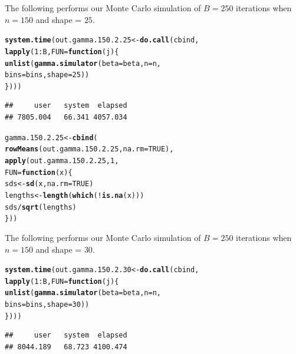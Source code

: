 \documentclass[11pt]{article}\usepackage[]{graphicx}\usepackage[]{color}
\makeatletter
\newcommand{\hlnum}[1]{\textcolor[rgb]{0.686,0.059,0.569}{#1}}%
\newcommand{\hlopt}[1]{\textcolor[rgb]{0,0,0}{#1}}%
\newcommand{\hlstd}[1]{\textcolor[rgb]{0.345,0.345,0.345}{#1}}%
\newcommand{\hlkwa}[1]{\textcolor[rgb]{0.161,0.373,0.58}{\textbf{#1}}}%
\newcommand{\hlkwb}[1]{\textcolor[rgb]{0.69,0.353,0.396}{#1}}%
\newcommand{\hlkwc}[1]{\textcolor[rgb]{0.333,0.667,0.333}{#1}}%
\newcommand{\hlkwd}[1]{\textcolor[rgb]{0.737,0.353,0.396}{\textbf{#1}}}%
\newenvironment{kframe}{%
 \def\at@end@of@kframe{}%
 \ifinner\ifhmode%
  \def\at@end@of@kframe{\end{minipage}}%
  \begin{minipage}{\columnwidth}%
 \fi\fi%
 \def\FrameCommand##1{\hskip\@totalleftmargin \hskip-\fboxsep
 \colorbox{shadecolor}{##1}\hskip-\fboxsep
     \hskip-\linewidth \hskip-\@totalleftmargin \hskip\columnwidth}%
 \MakeFramed {\advance\hsize-\width
   \@totalleftmargin\z@ \linewidth\hsize
   \@setminipage}}%
 {\par\unskip\endMakeFramed%
 \at@end@of@kframe}
\newenvironment{knitrout}{}{} %
\makeatother
\begin{document}
The following performs our Monte Carlo simulation of $B = 250$ iterations 
when $n = 150$ and shape = $25$.

\begin{knitrout}
\color{fgcolor}\begin{kframe}
\begin{alltt}
\hlkwd{system.time}\hlstd{(out.gamma.150.2.25} \hlkwb{<-} \hlkwd{do.call}\hlstd{(cbind,}
  \hlkwd{lapply}\hlstd{(}\hlnum{1}\hlopt{:}\hlstd{B,} \hlkwc{FUN} \hlstd{=} \hlkwa{function}\hlstd{(}\hlkwc{j}\hlstd{)\{}
    \hlkwd{unlist}\hlstd{(}\hlkwd{gamma.simulator}\hlstd{(}\hlkwc{beta} \hlstd{= beta,} \hlkwc{n} \hlstd{= n,}
      \hlkwc{bins} \hlstd{= bins,} \hlkwc{shape} \hlstd{=} \hlnum{25}\hlstd{))}
\hlstd{\})))}
\end{alltt}
\begin{verbatim}
##     user   system  elapsed 
## 7805.004   66.341 4057.034
\end{verbatim}
\end{kframe}
\end{knitrout}

\begin{knitrout}
\color{fgcolor}\begin{kframe}
\begin{alltt}
\hlstd{gamma.150.2.25} \hlkwb{<-} \hlkwd{cbind}\hlstd{(}
  \hlkwd{rowMeans}\hlstd{(out.gamma.150.2.25,} \hlkwc{na.rm} \hlstd{=} \hlnum{TRUE}\hlstd{),}
  \hlkwd{apply}\hlstd{(out.gamma.150.2.25,} \hlnum{1}\hlstd{,}
  \hlkwc{FUN} \hlstd{=} \hlkwa{function}\hlstd{(}\hlkwc{x}\hlstd{)\{}
    \hlstd{sds} \hlkwb{<-} \hlkwd{sd}\hlstd{(x,} \hlkwc{na.rm} \hlstd{=} \hlnum{TRUE}\hlstd{)}
    \hlstd{lengths} \hlkwb{<-} \hlkwd{length}\hlstd{(}\hlkwd{which}\hlstd{(}\hlopt{!}\hlkwd{is.na}\hlstd{(x)))}
    \hlstd{sds} \hlopt{/} \hlkwd{sqrt}\hlstd{(lengths)}
  \hlstd{\}))}
\end{alltt}
\end{kframe}
\end{knitrout}

The following performs our Monte Carlo simulation of $B = 250$ iterations 
when $n = 150$ and shape = $30$.

\begin{knitrout}
\color{fgcolor}\begin{kframe}
\begin{alltt}
\hlkwd{system.time}\hlstd{(out.gamma.150.2.30} \hlkwb{<-} \hlkwd{do.call}\hlstd{(cbind,}
  \hlkwd{lapply}\hlstd{(}\hlnum{1}\hlopt{:}\hlstd{B,} \hlkwc{FUN} \hlstd{=} \hlkwa{function}\hlstd{(}\hlkwc{j}\hlstd{)\{}
    \hlkwd{unlist}\hlstd{(}\hlkwd{gamma.simulator}\hlstd{(}\hlkwc{beta} \hlstd{= beta,} \hlkwc{n} \hlstd{= n,}
      \hlkwc{bins} \hlstd{= bins,} \hlkwc{shape} \hlstd{=} \hlnum{30}\hlstd{))}
\hlstd{\})))}
\end{alltt}
\begin{verbatim}
##     user   system  elapsed 
## 8044.189   68.723 4100.474
\end{verbatim}
\end{kframe}
\end{knitrout}
\end{document}
